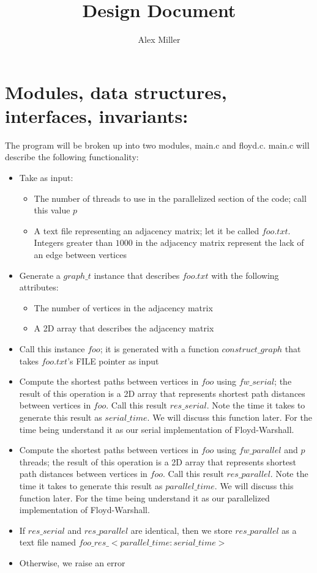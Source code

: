 \documentclass[]{article}
\title{Design Document}
\author{Alex Miller}
\begin{document}
	\maketitle
	
	\section{Modules, data structures, interfaces, invariants:}
	The program will be broken up into two modules, main.c and floyd.c. main.c will describe the following functionality:
	\begin{itemize}
		\item Take as input:
		\begin{itemize}
			\item The number of threads to use in the parallelized section of the code; call this value $p$
			\item A text file representing an adjacency matrix; let it be called $foo.txt$. Integers greater than $1000$ in the adjacency matrix represent the lack of an edge between vertices
		\end{itemize}
		\item Generate a $graph\_t$ instance that describes $foo.txt$ with the following attributes:
		\begin{itemize}
			\item The number of vertices in the adjacency matrix
			\item A 2D array that describes the adjacency matrix
		\end{itemize}
		\item Call this instance $foo$; it is generated with a function $construct\_graph$ that takes $foo.txt$'s FILE pointer as input
		\item Compute the shortest paths between vertices in $foo$ using $fw\_serial$; the result of this operation is a 2D array that represents shortest path distances between vertices in $foo$. Call this result $res\_serial$. Note the time it takes to generate this result as $serial\_time$. We will discuss this function later.  For the time being understand it as our serial implementation of Floyd-Warshall.
		\item Compute the shortest paths between vertices in $foo$ using $fw\_parallel$ and $p$ threads; the result of this operation is a 2D array that represents shortest path distances between vertices in $foo$. Call this result $res\_parallel$. Note the time it takes to generate this result as $parallel\_time$. We will discuss this function later. For the time being understand it as our parallelized implementation of Floyd-Warshall.
		\item If $res\_serial$ and $res\_parallel$ are identical, then we store $res\_parallel$ as a text file named $foo\_res\_<parallel\_time:serial\_time>$
		\item Otherwise, we raise an error
		
	\end{itemize}
\end{document}

